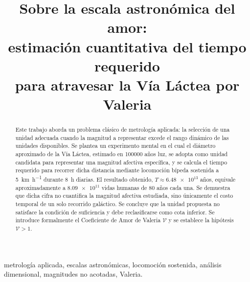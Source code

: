 \documentclass[conference]{IEEEtran}
\newcommand{\Vcoef}{\mathcal{V}}
\begin{document}
\title{Sobre la escala astronómica del amor:\\
estimación cuantitativa del tiempo requerido\\
para atravesar la Vía Láctea por Valeria}

\author{
}

\maketitle

\begin{abstract}
Este trabajo aborda un problema clásico de metrología aplicada: la selección
de una unidad adecuada cuando la magnitud a representar excede el rango
dinámico de las unidades disponibles. Se plantea un experimento mental en el
cual el diámetro aproximado de la Vía Láctea, estimado en \num{100000} años
luz, se adopta como unidad candidata para representar una magnitud afectiva
específica, y se calcula el tiempo requerido para recorrer dicha distancia
mediante locomoción bípeda sostenida a \qty{5}{\kilo\meter\per\hour} durante
\qty{8}{\hour} diarias. El resultado obtenido,
$T \approx \num{6.48e13}$ años, equivale aproximadamente a
$\num{8.09e11}$ vidas humanas de \num{80} años cada una. Se demuestra que
dicha cifra no cuantifica la magnitud afectiva estudiada, sino únicamente el
costo temporal de un solo recorrido galáctico. Se concluye que la unidad
propuesta no satisface la condición de suficiencia y debe reclasificarse como
cota inferior. Se introduce formalmente el Coeficiente de Amor de Valeria
$\Vcoef$ y se establece la hipótesis $\Vcoef > 1$.
\end{abstract}

\begin{IEEEkeywords}
metrología aplicada, escalas astronómicas, locomoción sostenida, análisis
dimensional, magnitudes no acotadas, Valeria.
\end{IEEEkeywords}

\end{document}
